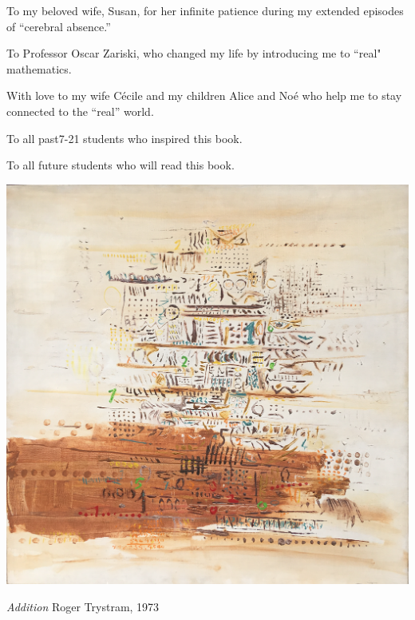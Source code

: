 %
%
%

\begin{dedication}
To my beloved wife, Susan, for her infinite patience during my extended episodes of ``cerebral absence.''

\smallskip

\noindent
To Professor Oscar Zariski, who changed my life by introducing me to ``real" mathematics.
\smallskip

\noindent
With love to my wife C\'ecile and my children Alice and No\'e who help me to stay connected to the ``real'' world. 
\bigskip

\noindent To all past7-21 students who inspired this book.

\noindent To all future students who will read this book.
\end{dedication}

\vspace*{.25in}

\centerline{\includegraphics[scale=0.75]{AdditionForSpringer.png}}

\medskip

\centerline{{\large\em  Addition} \hspace*{4.5in} {\small Roger Trystram, 1973}}


